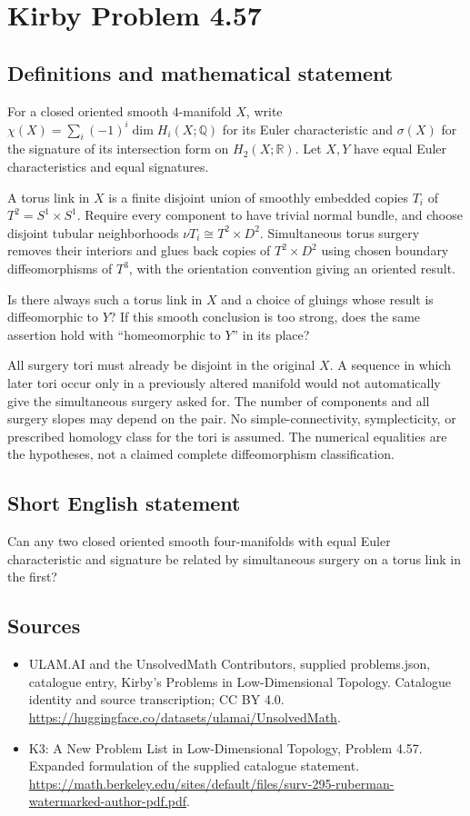 \documentclass[11pt,a4paper]{article}
\begin{document}
\section*{Kirby Problem 4.57}\label{statement}

\subsection{Definitions and mathematical statement}
For a closed oriented smooth $4$-manifold $X$, write
$\chi(X)=\sum_i(-1)^i\dim H_i(X;\mathbb Q)$ for its Euler
characteristic and $\sigma(X)$ for the signature of its intersection
form on $H_2(X;\mathbb R)$. Let $X,Y$ have equal Euler
characteristics and equal signatures.

A torus link in $X$ is a finite disjoint union of smoothly embedded
copies $T_i$ of $T^2=S^1\times S^1$. Require every component to
have trivial normal bundle, and choose disjoint tubular neighborhoods
$\nu T_i\cong T^2\times D^2$. Simultaneous torus surgery removes
their interiors and glues back copies of $T^2\times D^2$ using
chosen boundary diffeomorphisms of $T^3$, with the orientation
convention giving an oriented result.

Is there always such a torus link in $X$ and a choice of gluings
whose result is diffeomorphic to $Y$? If this smooth conclusion is
too strong, does the same assertion hold with ``homeomorphic to $Y$''
in its place?

All surgery tori must already be disjoint in the original $X$.
A sequence in which later tori occur only in a previously altered
manifold would not automatically give the simultaneous surgery asked
for. The number of components and all surgery slopes may depend on
the pair. No simple-connectivity, symplecticity, or prescribed homology
class for the tori is assumed. The numerical equalities are the
hypotheses, not a claimed complete diffeomorphism classification.
\subsection{Short English statement}
Can any two closed oriented smooth four-manifolds with equal Euler characteristic and signature be related by simultaneous surgery on a torus link in the first?
\subsection{Sources}
\begin{itemize}
\item[S1] ULAM.AI and the UnsolvedMath Contributors, supplied problems.json, catalogue entry, Kirby's Problems in Low-Dimensional Topology. Catalogue identity and source transcription; CC BY 4.0.
\url{https://huggingface.co/datasets/ulamai/UnsolvedMath}.
\item[S2] K3: A New Problem List in Low-Dimensional Topology, Problem 4.57. Expanded formulation of the supplied catalogue statement.
\url{https://math.berkeley.edu/sites/default/files/surv-295-ruberman-watermarked-author-pdf.pdf}.
\end{itemize}
\end{document}

